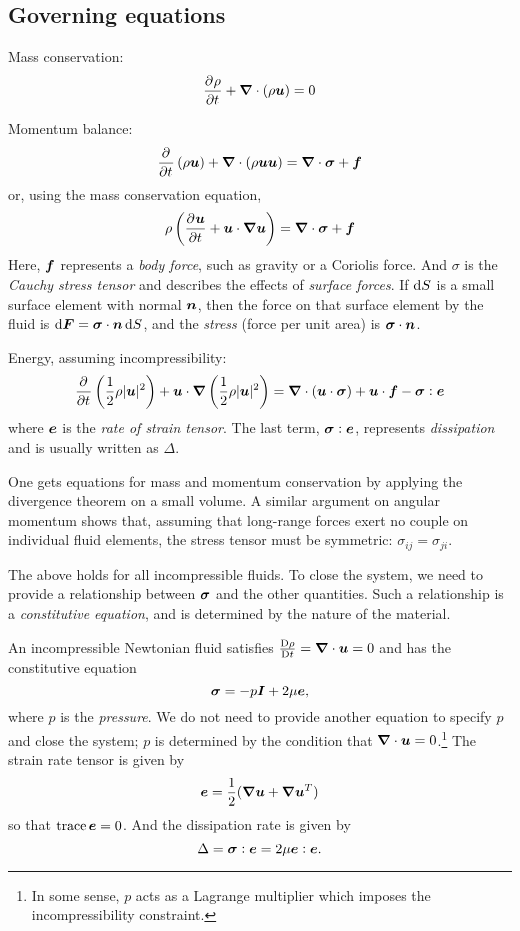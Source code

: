\documentclass{article}
\begin{document}
\subsection{Governing equations}

Mass conservation: 
$$ \dpd{\rho}{t} + \divg(\rho\bs{u}) = 0 $$

Momentum balance:
$$ \dpd{}{t}(\rho\bs{u}) + \divg(\rho\bs{u}\bs{u}) = \divg\bs{\sigma} + \bs{f} $$
or, using the mass conservation equation,
$$ \rho\left(\dpd{\bs{u}}{t} + \bs{u}\cdot\grad\bs{u}\right) = \divg\bs{\sigma} + \bs{f} $$
Here, $\boldsymbol{f}$ represents a \textit{body force}, such as gravity or a Coriolis
force.  And $\sigma$ is the \textit{Cauchy stress tensor} and describes the
effects of \textit{surface forces}. If $\dif S$ is a small surface element with
normal $\boldsymbol{n}$, then the force on that surface element by the fluid is
$\dif\bs{F}=\bs{\sigma}\cdot\bs{n}\dif S$, and the \textit{stress} (force per
unit area) is $\boldsymbol{\sigma}\cdot\boldsymbol{n}$.

Energy, assuming incompressibility:
$$ \dpd{}{t} \left(\frac{1}{2}\rho|\bs{u}|^2\right) 
   + \bs{u}\cdot\grad\left(\frac{1}{2}\rho|\bs{u}|^2\right) 
   = \divg(\bs{u}\cdot\bs{\sigma}) + \bs{u}\cdot\bs{f} - \bs{\sigma}:\bs{e} $$
where $\boldsymbol{e}$ is the \textit{rate of strain tensor}. The last term,
$\boldsymbol{\sigma}:\boldsymbol{e}$, represents \textit{dissipation} and is usually written as
$\Delta$.

One gets equations for mass and momentum conservation by applying the divergence
theorem on a small volume. A similar argument on angular momentum shows that,
assuming that long-range forces exert no couple on individual fluid elements,
the stress tensor must be symmetric: $\sigma_{ij}=\sigma_{ji}$.

The above holds for all incompressible fluids. To close the system, we need to
provide a relationship between $\boldsymbol{\sigma}$ and the other quantities. Such a
relationship is a \textit{constitutive equation}, and is determined by the
nature of the material.

An incompressible Newtonian fluid satisfies $\frac{\mathrm{D}\rho}{\mathrm{D}t}=\boldsymbol{\nabla}\cdot\boldsymbol{u}=0$ and has
the constitutive equation
$$ \boldsymbol{\sigma} = -p \boldsymbol{I} + 2\mu\boldsymbol{e}, $$
where $p$ is the \textit{pressure}. We do not need to provide another equation
to specify $p$ and close the system; $p$ is determined by the condition that
$\boldsymbol{\nabla}\cdot\boldsymbol{u}=0$.\footnote{In some sense, $p$ acts as a Lagrange multiplier which
imposes the incompressibility constraint.} The strain rate tensor is given by
$$ \boldsymbol{e} = \frac{1}{2}(\boldsymbol{\nabla}\boldsymbol{u}+\boldsymbol{\nabla}\boldsymbol{u}^T) $$
so that $\mathrm{trace}\,\boldsymbol{e} = 0$. And the dissipation rate is given by
$$\Delta = \boldsymbol{\sigma}:\boldsymbol{e}=2\mu\boldsymbol{e}:\boldsymbol{e}.$$
\end{document}
